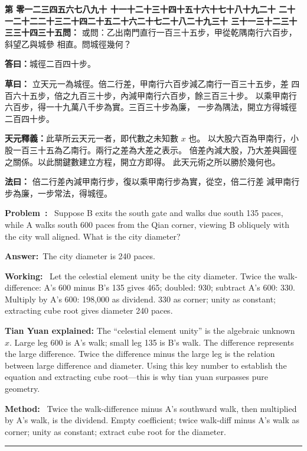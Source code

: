 \documentclass[9pt,a4paper]{article}
\newcounter{probnum}
\newcounter{overallnum}
\newcommand{\chnum}[1]{%
  \ifcase#1 零\or 一\or 二\or 三\or 四\or 五\or 六\or 七\or 八\or 九\or 十\or
    十一\or 十二\or 十三\or 十四\or 十五\or 十六\or 十七\or 十八\or 十九\or 二十\or
    二十一\or 二十二\or 二十三\or 二十四\or 二十五\or 二十六\or 二十七\or 二十八\or 二十九\or 三十\or
    三十一\or 三十二\or 三十三\or 三十四\or 三十五\fi}
\newcommand{\problem}[1]{\stepcounter{probnum}\stepcounter{overallnum}\par\noindent\textbf{\color{volcolor}第\chnum{\value{probnum}}問：}#1\par\vspace{0.15cm}}
\newcommand{\answer}[1]{\par\noindent\textbf{答曰：}#1\par\vspace{0.15cm}}
\newcommand{\working}[1]{\par\noindent\textbf{草曰：}#1\par\vspace{0.15cm}}
\newcommand{\method}[1]{\par\noindent\textbf{法曰：}#1\par\vspace{0.25cm}}
\newcommand{\eproblem}[1]{\par\noindent\textbf{\color{volcolor}Problem~\theoverallnum:}~#1\par\vspace{0.15cm}}
\newcommand{\eanswer}[1]{\par\noindent\textbf{Answer:}~#1\par\vspace{0.15cm}}
\newcommand{\eworking}[1]{\par\noindent\textbf{Working:}~#1\par\vspace{0.15cm}}
\newcommand{\emethod}[1]{\par\noindent\textbf{Method:}~#1\par\vspace{0.25cm}}
\begin{document}
\noindent\begin{minipage}[t]{0.48\textwidth}
\problem{
或問：乙出南門直行一百三十五步，甲從乾隅南行六百步，斜望乙與城參
相直。問城徑幾何？
}

\answer{城徑二百四十步。}

\working{
立天元一為城徑。倍二行差，甲南行六百步減乙南行一百三十五步，差
四百六十五步，倍之九百三十步，內減甲南行六百步，餘三百三十步。
以乘甲南行六百步，得一十九萬八千步為實。三百三十步為廉，
一步為隅法，開立方得城徑二百四十步。

\textbf{天元釋義：}此草所云天元一者，即代數之未知數 $x$ 也。
以大股六百為甲南行，小股一百三十五為乙南行。兩行之差為大差之表示。
倍差內減大股，乃大差與圓徑之關係。以此關鍵數建立方程，開立方即得。
此天元術之所以勝於幾何也。
}

\method{
倍二行差內減甲南行步，復以乘甲南行步為實，從空，倍二行差
減甲南行步為廉，一步常法，得城徑。
}
\end{minipage}%
\hfill%
\begin{minipage}[t]{0.50\textwidth}
\eproblem{
Suppose B exits the south gate and walks due south 135 paces, while A walks
south 600 paces from the Qian corner, viewing B obliquely with the city wall
aligned. What is the city diameter?
}

\eanswer{The city diameter is 240 paces.}

\eworking{
Let the celestial element unity be the city diameter. Twice the walk-difference:
A's 600 minus B's 135 gives 465; doubled: 930; subtract A's 600: 330.
Multiply by A's 600: 198,000 as dividend. 330 as corner; unity as constant;
extracting cube root gives diameter 240 paces.

\textbf{Tian Yuan explained:} The ``celestial element unity'' is the algebraic
unknown $x$. Large leg 600 is A's walk; small leg 135 is B's walk. The
difference represents the large difference. Twice the difference minus the
large leg is the relation between large difference and diameter. Using this
key number to establish the equation and extracting cube root---this is why
tian yuan surpasses pure geometry.
}

\emethod{
Twice the walk-difference minus A's southward walk, then multiplied by A's
walk, is the dividend. Empty coefficient; twice walk-diff minus A's walk as
corner; unity as constant; extract cube root for the diameter.
}
\end{minipage}
\vspace{0.15cm}

\vspace{0.15cm}
\noindent\rule{\textwidth}{0.2pt}
\vspace{0.15cm}
\end{document}
